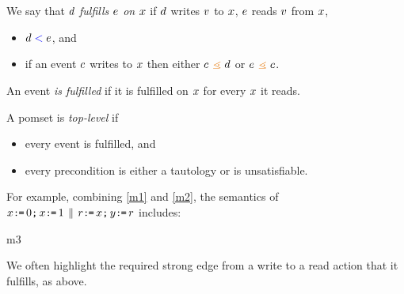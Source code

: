 
\begin{definition}
  \label{def:rf}
  We say that $d$ \emph{fulfills $e$ on $x$} if $d$ writes
  $v$ to $x$, $e$ reads $v$ from $x$,
  \begin{itemize}
  \item $d \mathrel{{\color{blue}<}} e$, and
  \item if an event $c$ writes to $x$ then either $\cEv \gtN \bEv$ or $\aEv \gtN \cEv$.
  \end{itemize}

  An event \emph{is fulfilled} if it is fulfilled on $x$ for every
  $x$ it reads.

  A pomset is \emph{top-level} if
  \begin{itemize}
  \item every event is fulfilled, and
  \item every precondition is either a tautology or is unsatisfiable.
  \end{itemize}
\end{definition}

For example, combining \eqref{m1} and \eqref{m2}, the semantics of
\begin{math}
  x\texttt{:}\mkern-1mu\texttt{=}\, 0\texttt{;}\,
  x\texttt{:}\mkern-1mu\texttt{=}\, 1
  \,\mathbin{\|}\,
  r\texttt{:}\mkern-1mu\texttt{=}\, x\texttt{;}\,
  y\texttt{:}\mkern-1mu\texttt{=}\, r
\end{math}
includes:
\begin{tikzdisplaylabel}[node distance=1em]{m3}
\end{tikzdisplaylabel}
We often highlight the required strong edge from a write to a read action that it
fulfills, as above.

